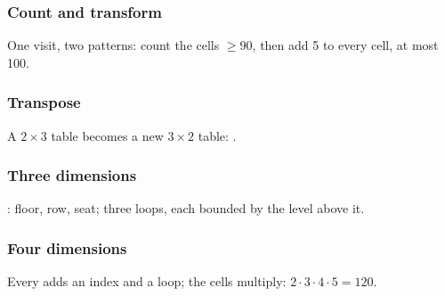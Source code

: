 \documentclass[aspectratio=169,10pt,compress]{beamer}
\begin{document}
\begin{frame}[t,fragile] \frametitle{Count and transform}

	\footnotesize One visit, two patterns: count the cells $\ge 90$, then add 5 to every cell, at most 100.
\end{frame}




\begin{frame}[t,fragile] \frametitle{Transpose}

	\footnotesize A $2 \times 3$ table becomes a new $3 \times 2$ table: .
\end{frame}








\begin{frame}[t,fragile] \frametitle{Three dimensions}

	\footnotesize {}: floor, row, seat; three loops, each bounded by the level above it.
\end{frame}




\begin{frame}[t,fragile] \frametitle{Four dimensions}

	\footnotesize Every \hCode{[]} adds an index and a loop; the cells multiply: $2 \cdot 3 \cdot 4 \cdot 5 = 120$.
\end{frame}




\end{document}
